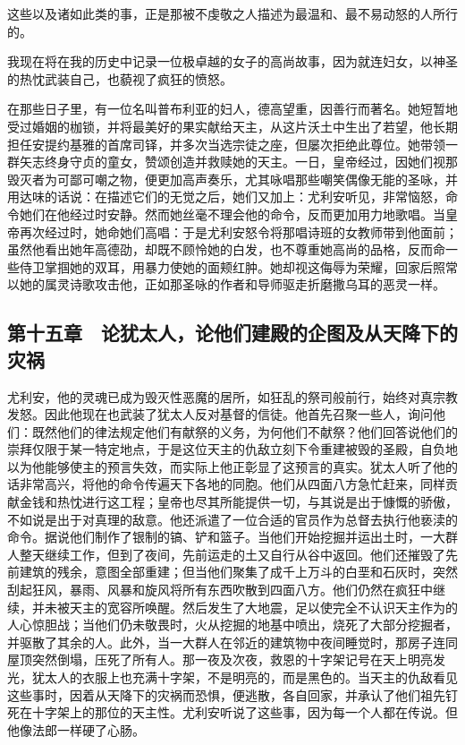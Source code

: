 这些以及诸如此类的事，正是那被不虔敬之人描述为最温和、最不易动怒的人所行的。\par

我现在将在我的历史中记录一位极卓越的女子的高尚故事，因为就连妇女，以神圣的热忱武装自己，也藐视了疯狂的愤怒。\par

在那些日子里，有一位名叫普布利亚的妇人，德高望重，因善行而著名。她短暂地受过婚姻的枷锁，并将最美好的果实献给天主，从这片沃土中生出了若望，他长期担任安提约基雅的首席司铎，并多次当选宗徒之座，但屡次拒绝此尊位。她带领一群矢志终身守贞的童女，赞颂创造并救赎她的天主。一日，皇帝经过，因她们视那毁灭者为可鄙可嘲之物，便更加高声奏乐，尤其咏唱那些嘲笑偶像无能的圣咏，并用达味的话说：在描述它们的无觉之后，她们又加上：尤利安听见，非常恼怒，命令她们在他经过时安静。然而她丝毫不理会他的命令，反而更加用力地歌唱。当皇帝再次经过时，她命她们高唱：于是尤利安怒令将那唱诗班的女教师带到他面前；虽然他看出她年高德劭，却既不顾怜她的白发，也不尊重她高尚的品格，反而命一些侍卫掌掴她的双耳，用暴力使她的面颊红肿。她却视这侮辱为荣耀，回家后照常以她的属灵诗歌攻击他，正如那圣咏的作者和导师驱走折磨撒乌耳的恶灵一样。\par


\subsection{第十五章　论犹太人，论他们建殿的企图及从天降下的灾祸}

尤利安，他的灵魂已成为毁灭性恶魔的居所，如狂乱的祭司般前行，始终对真宗教发怒。因此他现在也武装了犹太人反对基督的信徒。他首先召聚一些人，询问他们：既然他们的律法规定他们有献祭的义务，为何他们不献祭？他们回答说他们的崇拜仅限于某一特定地点，于是这位天主的仇敌立刻下令重建被毁的圣殿，自负地以为他能够使主的预言失效，而实际上他正彰显了这预言的真实。犹太人听了他的话非常高兴，将他的命令传遍天下各地的同胞。他们从四面八方急忙赶来，同样贡献金钱和热忱进行这工程；皇帝也尽其所能提供一切，与其说是出于慷慨的骄傲，不如说是出于对真理的敌意。他还派遣了一位合适的官员作为总督去执行他亵渎的命令。据说他们制作了银制的镐、铲和篮子。当他们开始挖掘并运出土时，一大群人整天继续工作，但到了夜间，先前运走的土又自行从谷中返回。他们还摧毁了先前建筑的残余，意图全部重建；但当他们聚集了成千上万斗的白垩和石灰时，突然刮起狂风，暴雨、风暴和旋风将所有东西吹散到四面八方。他们仍然在疯狂中继续，并未被天主的宽容所唤醒。然后发生了大地震，足以使完全不认识天主作为的人心惊胆战；当他们仍未敬畏时，火从挖掘的地基中喷出，烧死了大部分挖掘者，并驱散了其余的人。此外，当一大群人在邻近的建筑物中夜间睡觉时，那房子连同屋顶突然倒塌，压死了所有人。那一夜及次夜，救恩的十字架记号在天上明亮发光，犹太人的衣服上也充满十字架，不是明亮的，而是黑色的。当天主的仇敌看见这些事时，因着从天降下的灾祸而恐惧，便逃散，各自回家，并承认了他们祖先钉死在十字架上的那位的天主性。尤利安听说了这些事，因为每一个人都在传说。但他像法郎一样硬了心肠。\par

